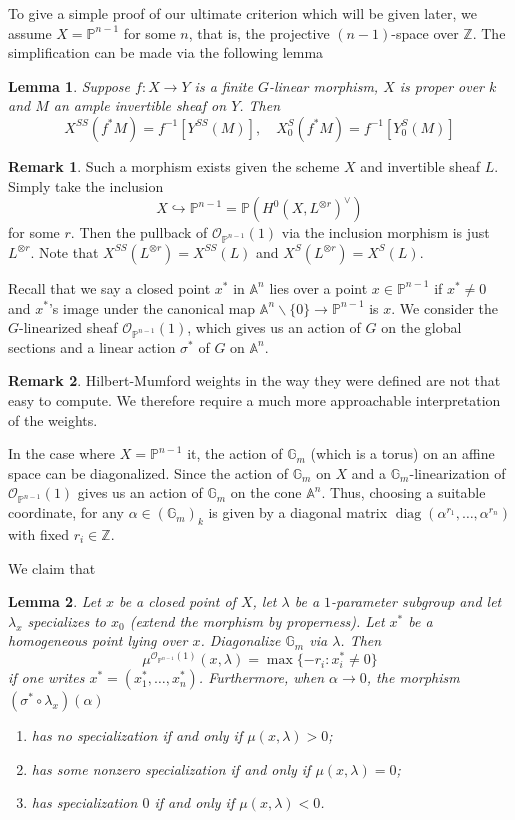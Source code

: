 \documentclass[12pt]{article}
\newtheorem{lemma}{Lemma}[section]
\theoremstyle{remark}
\theoremstyle{definition}
\newtheorem{remark}{Remark}[section]
\newcommand{\s}[0]{\sigma}
\newcommand{\Z}[0]{\mathbb{Z}}
\newcommand{\A}[0]{\mathbb{A}}
\newcommand{\G}[0]{\mathbb{G}}
\begin{document}
    To give a simple proof of our ultimate criterion which will be given later, we assume $X=\mathbb P^{n-1}$ for some $n$, that is, the projective $(n-1)$-space over $\Z$. The simplification can be made via the following lemma
    \begin{lemma}
        Suppose $f:X\to Y$ is a finite $G$-linear morphism, $X$ is proper over $k$ and $M$ an ample invertible sheaf on $Y$. Then
        \[X^{SS}(f^*M)=f^{-1}\left[Y^{SS}(M)\right],\quad X_{0}^S(f^*M)=f^{-1}\left[Y_0^S(M)\right]\]
    \end{lemma}
    \begin{remark}
        Such a morphism exists given the scheme $X$ and invertible sheaf $L$. Simply take the inclusion
        \[X\hookrightarrow \mathbb P^{n-1}=\mathbb P\left(H^0(X, L^{\otimes r})^\vee\right)\]
        for some $r$. Then the pullback of $\mathcal O_{\mathbb P^{n-1}}(1)$ via the inclusion morphism is just $L^{\otimes r}$. Note that $X^{SS}(L^{\otimes r})=X^{SS}(L)$ and $X^{S}(L^{\otimes r})=X^{S}(L)$.
    \end{remark}
    Recall that we say a closed point $x^*$ in $\A^n$ lies over a point $x\in \mathbb P^{n-1}$ if $x^*\neq 0$ and $x^*$'s image under the canonical map $\A^n\backslash\{0\}\to\mathbb P^{n-1}$ is $x$. We consider the $G$-linearized sheaf $\mathcal O_{\mathbb P^{n-1}}(1)$, which gives us an action of $G$ on the global sections and a linear action $\s^*$ of $G$ on $\A^n$.
    \begin{remark}
        Hilbert-Mumford weights in the way they were defined are not that easy to compute. We therefore require a much more approachable interpretation of the weights.

        In the case where $X=\mathbb P^{n-1}$ it, the action of $\G_m$ (which is a torus) on an affine space can be diagonalized. Since the action of $\G_m$ on $X$ and a $\G_m$-linearization of $\mathcal O_{\mathbb P^{n-1}}(1)$ gives us an action of $\G_m$ on the cone $\A^n$. Thus, choosing a suitable coordinate, for any $\alpha\in(\G_m)_k$ is given by a diagonal matrix $\operatorname{diag}(\alpha^{r_1},\dots, \alpha^{r_n})$ with fixed $r_i\in\Z$.
    \end{remark}
    We claim that
    \begin{lemma}
        Let $x$ be a closed point of $X$, let $\lambda$ be a $1$-parameter subgroup and let $\lambda_x$ specializes to $x_0$ (extend the morphism by properness). Let $x^*$ be a homogeneous point lying over $x$. Diagonalize $\G_m$ via $\lambda$. Then
        \[\mu^{\mathcal O_{\mathbb P^{n-1}}(1)}(x,\lambda)=\max\{-r_i:x_i^*\neq 0\}\]
        if one writes $x^*=(x_1^*,\dots, x_n^*)$. Furthermore, when $\alpha\to 0$, the morphism $(\s^*\circ\lambda_x)(\alpha)$
        \begin{enumerate}[\normalfont(i)]
            \item has no specialization if and only if $\mu(x,\lambda)>0$;
            \item has some nonzero specialization if and only if $\mu(x,\lambda)=0$;
            \item has specialization $0$ if and only if $\mu(x,\lambda)<0$.
        \end{enumerate}
    \end{lemma}
\end{document}
